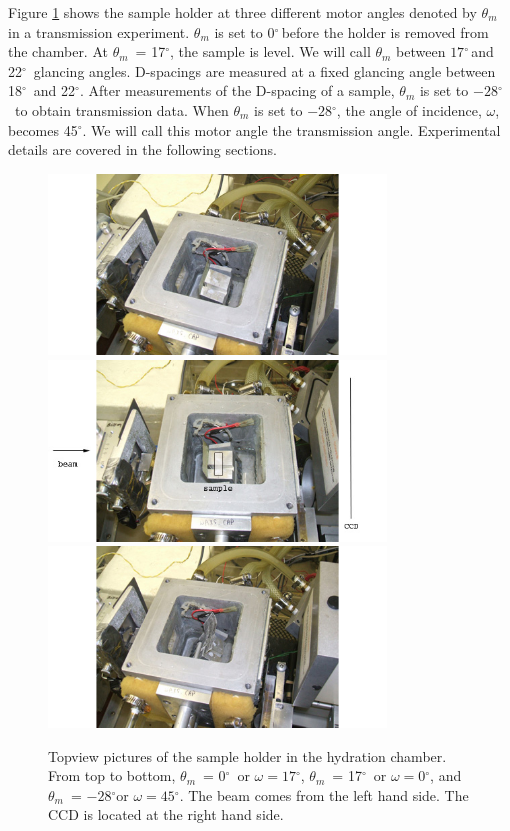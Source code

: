 \documentclass[letterpaper,12pt]{article}
\newcommand{\dg}{$^{\circ}$}%
\newcommand{\motor}{$\theta_m$}%
\begin{document}
Figure \ref{fig:chamber} shows the sample holder at three different motor angles denoted by $\theta_m$ in a transmission experiment. $\theta_m$ is set to 0\dg\,before the holder is removed from the chamber. At \motor\ = 17\dg, the sample is level. We will call $\theta_m$ between $17$\dg\,and 22\dg\, glancing angles. D-spacings are measured at a fixed glancing angle between 18\dg\, and 22\dg. After measurements of the D-spacing of a sample, $\theta_m$ is set to $-28$\dg\ to obtain transmission data. When $\theta_m$ is set to $-28$\dg, the angle of incidence, $\omega$, becomes 45\dg. We will call this motor angle the transmission angle. Experimental details are covered in the following sections.
\begin{figure}[htbp]
	\centering
	\includegraphics[width=0.8\textwidth]{chamber1}
	\includegraphics[width=0.8\textwidth]{chamber2}
	\includegraphics[width=0.8\textwidth]{chamber3}
	\caption[Topview pictures of the sample holder in the hydration chamber]{Topview pictures of the sample holder in the hydration chamber. From top to bottom, \motor\ = 0\dg\ or $\omega=17$\dg, \motor\ = 17\dg\ or $\omega=0$\dg, and \motor\ = $-28$\dg or $\omega=45$\dg. The beam comes from the left hand side. The CCD is located at the right hand side.}
	\label{fig:chamber}
\end{figure}
\end{document}
